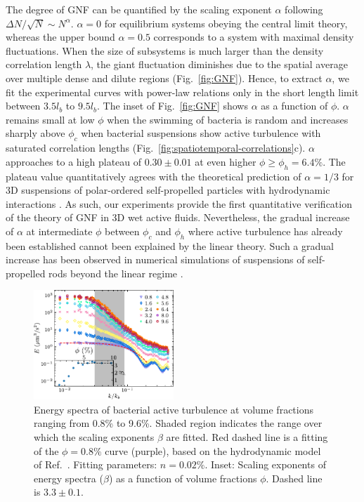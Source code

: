 \documentclass[twocolumn,aps,prl,amsmath,amssymb,longbibliography]{revtex4-2}
\begin{document}
The degree of GNF can be quantified by the scaling exponent $\alpha$ following $\Delta N/\sqrt{N} \sim N^\alpha$. $\alpha=0$ for equilibrium systems obeying the central limit theory, whereas the upper bound $\alpha = 0.5$ corresponds to a system with maximal density fluctuations. When the size of subsystems is much larger than the density correlation length $\lambda$, the giant fluctuation diminishes due to the spatial average over multiple dense and dilute regions (Fig.~\ref{fig:GNF}).
Hence, to extract $\alpha$, we fit the experimental curves with power-law relations only in the short length limit between $3.5 l_b$ to $9.5 l_b$. The inset of Fig.~\ref{fig:GNF} shows $\alpha$ as a function of $\phi$. $\alpha$ remains small at low $\phi$ when the swimming of bacteria is random and increases sharply above $\phi_c$ when bacterial suspensions show active turbulence with saturated correlation lengths (Fig.~\ref{fig:spatiotemporal-correlations}c).
$\alpha$ approaches to a high plateau of $0.30 \pm 0.01$ at even higher $\phi \geq \phi_h = 6.4\%$. The plateau value quantitatively agrees with the theoretical prediction of $\alpha = 1/3$ for 3D suspensions of polar-ordered self-propelled particles with hydrodynamic interactions \cite{AditiSimha2002}. As such, our experiments provide the first quantitative verification of the theory of GNF in 3D wet active fluids. Nevertheless, the gradual increase of $\alpha$ at intermediate $\phi$ between $\phi_c$ and $\phi_h$ where active turbulence has already been established cannot been explained by the linear theory. Such a gradual increase has been observed in numerical simulations of suspensions of self-propelled rods beyond the linear regime \cite{Saintillan2012}.

\begin{figure}[!]
\begin{center}\includegraphics[width=0.47\textwidth]{Figures/energy-spectra/v3.pdf}
\caption[Concentration dependence of energy spectra.]
{
Energy spectra of bacterial active turbulence at volume fractions ranging from 0.8\% to 9.6\%. Shaded region indicates the range over which the scaling exponents $\beta$ are fitted. Red dashed line is a fitting of the $\phi=0.8\%$ curve (purple), based on the hydrodynamic model of Ref.~\cite{Bardfalvy2019}. Fitting parameters: $n=0.02\%$.
Inset: Scaling exponents of energy spectra ($\beta$) as a function of volume fractions $\phi$. Dashed line is $3.3 \pm 0.1$.
}
\label{fig:energy-spectra}
\end{center}
\end{figure}
\end{document}
